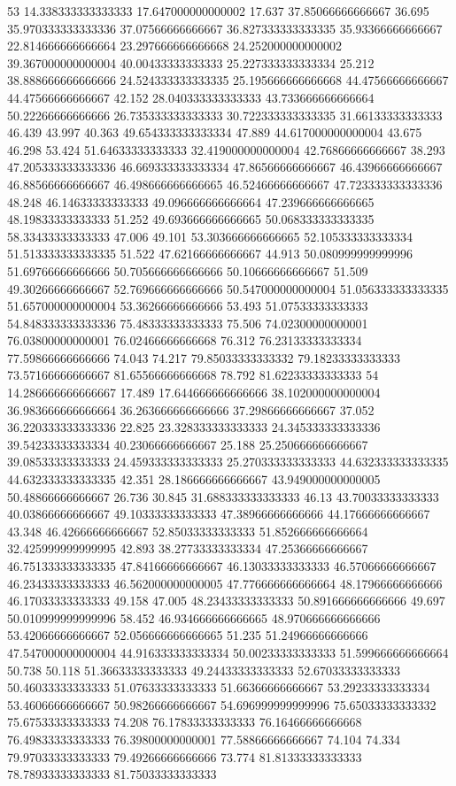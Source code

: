53 14.338333333333333 17.647000000000002 17.637 37.85066666666667 36.695 35.970333333333336 37.07566666666667 36.827333333333335 35.93366666666667 22.814666666666664 23.297666666666668 24.252000000000002 39.367000000000004 40.00433333333333 25.227333333333334 25.212 38.888666666666666 24.524333333333335 25.195666666666668 44.47566666666667 44.47566666666667 42.152 28.040333333333333 43.733666666666664 50.22266666666666 26.735333333333333 30.722333333333335 31.66133333333333 46.439 43.997 40.363 49.654333333333334 47.889 44.617000000000004 43.675 46.298 53.424 51.64633333333333 32.419000000000004 42.76866666666667 38.293 47.205333333333336 46.669333333333334 47.86566666666667 46.43966666666667 46.88566666666667 46.498666666666665 46.52466666666667 47.723333333333336 48.248 46.14633333333333 49.096666666666664 47.239666666666665 48.19833333333333 51.252 49.693666666666665 50.068333333333335 58.33433333333333 47.006 49.101 53.303666666666665 52.105333333333334 51.513333333333335 51.522 47.62166666666667 44.913 50.080999999999996 51.69766666666666 50.705666666666666 50.10666666666667 51.509 49.30266666666667 52.769666666666666 50.547000000000004 51.056333333333335 51.657000000000004 53.36266666666666 53.493 51.07533333333333 54.848333333333336 75.48333333333333 75.506 74.02300000000001 76.03800000000001 76.02466666666668 76.312 76.23133333333334 77.59866666666666 74.043 74.217 79.85033333333332 79.18233333333333 73.57166666666667 81.65566666666668 78.792 81.62233333333333
54 14.286666666666667 17.489 17.644666666666666 38.102000000000004 36.983666666666664 36.263666666666666 37.29866666666667 37.052 36.220333333333336 22.825 23.328333333333333 24.345333333333336 39.54233333333334 40.23066666666667 25.188 25.250666666666667 39.08533333333333 24.459333333333333 25.270333333333333 44.632333333333335 44.632333333333335 42.351 28.186666666666667 43.949000000000005 50.48866666666667 26.736 30.845 31.688333333333333 46.13 43.70033333333333 40.03866666666667 49.10333333333333 47.38966666666666 44.17666666666667 43.348 46.42666666666667 52.85033333333333 51.852666666666664 32.425999999999995 42.893 38.27733333333334 47.25366666666667 46.751333333333335 47.84166666666667 46.13033333333333 46.57066666666667 46.23433333333333 46.562000000000005 47.776666666666664 48.17966666666666 46.17033333333333 49.158 47.005 48.23433333333333 50.891666666666666 49.697 50.010999999999996 58.452 46.934666666666665 48.970666666666666 53.42066666666667 52.056666666666665 51.235 51.24966666666666 47.547000000000004 44.916333333333334 50.00233333333333 51.599666666666664 50.738 50.118 51.36633333333333 49.24433333333333 52.67033333333333 50.46033333333333 51.07633333333333 51.66366666666667 53.29233333333334 53.46066666666667 50.98266666666667 54.696999999999996 75.65033333333332 75.67533333333333 74.208 76.17833333333333 76.16466666666668 76.49833333333333 76.39800000000001 77.58866666666667 74.104 74.334 79.97033333333333 79.49266666666666 73.774 81.81333333333333 78.78933333333333 81.75033333333333

